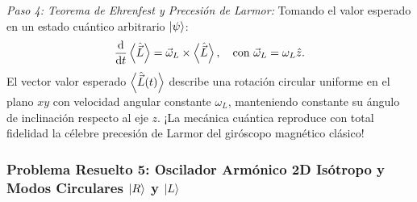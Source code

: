\begin{ejemplobox}
    \textit{Paso 4: Teorema de Ehrenfest y Precesión de Larmor:}
    Tomando el valor esperado en un estado cuántico arbitrario $\left| \psi \right\rangle$:
    \begin{equation}
        \frac{\mathrm{d}}{\mathrm{d} t}\left\langle \hat{\vec{L}} \right\rangle = \vec{\omega}_L \times \left\langle \hat{\vec{L}} \right\rangle, \quad \text{con } \vec{\omega}_L = \omega_L\hat{z}.
    \end{equation}
    El vector valor esperado $\left\langle \hat{\vec{L}}(t) \right\rangle$ describe una rotación circular uniforme en el plano $xy$ con velocidad angular constante $\omega_L$, manteniendo constante su ángulo de inclinación respecto al eje $z$. ¡La mecánica cuántica reproduce con total fidelidad la célebre precesión de Larmor del giróscopo magnético clásico!
\end{ejemplobox}

\subsubsection[Problema 5: Oscilador 2D y modos circulares]{Problema Resuelto 5: Oscilador Armónico 2D Isótropo y Modos Circulares \texorpdfstring{$\left| R \right\rangle$}{R} y \texorpdfstring{$\left| L \right\rangle$}{L}}
